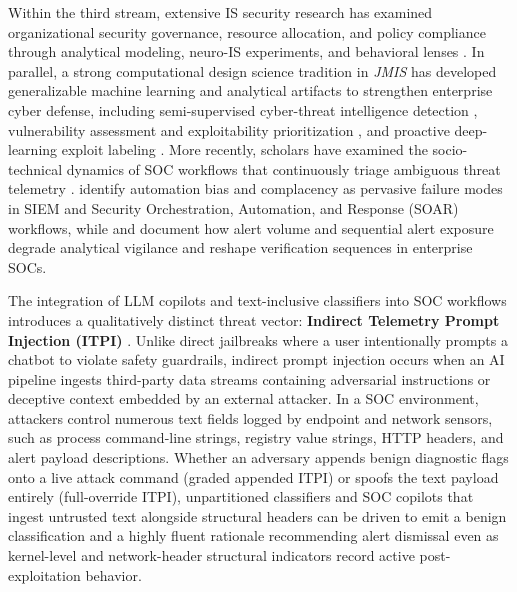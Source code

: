 \documentclass[11pt,a4paper]{article}
\begin{document}
Within the third stream, extensive IS security research has examined organizational security governance, resource allocation, and policy compliance through analytical modeling, neuro-IS experiments, and behavioral lenses \citep{dhillon2001current, willison2013beyond, darcy2014stress, lowry2014control, lowry2015explaining, anderson2016warning, willison2016neutralization, cram2017organizational, darcy2017cognitive, lowry2017security, moody2018unified, trang2019neutralization, cram2020seeing, liu2020centralized, li2021roles, jensen2022improving, schuetz2025heeding}. In parallel, a strong computational design science tradition in \textit{JMIS} has developed generalizable machine learning and analytical artifacts to strengthen enterprise cyber defense, including semi-supervised cyber-threat intelligence detection \citep{ebrahimi2020semi}, vulnerability assessment and exploitability prioritization \citep{li2022assessing}, and proactive deep-learning exploit labeling \citep{ampel2024improving}. More recently, scholars have examined the socio-technical dynamics of SOC workflows that continuously triage ambiguous threat telemetry \citep{naseer2023enabling, tilbury2024automation, tariq2025alert, srinivas2025ai, bartal2026alert}. \citet{tilbury2024automation} identify automation bias and complacency as pervasive failure modes in SIEM and Security Orchestration, Automation, and Response (SOAR) workflows, while \citet{tariq2025alert} and \citet{bartal2026alert} document how alert volume and sequential alert exposure degrade analytical vigilance and reshape verification sequences in enterprise SOCs.

The integration of LLM copilots and text-inclusive classifiers into SOC workflows introduces a qualitatively distinct threat vector: \textbf{Indirect Telemetry Prompt Injection (ITPI)} \citep{srinivas2025ai}. Unlike direct jailbreaks where a user intentionally prompts a chatbot to violate safety guardrails, indirect prompt injection occurs when an AI pipeline ingests third-party data streams containing adversarial instructions or deceptive context embedded by an external attacker. In a SOC environment, attackers control numerous text fields logged by endpoint and network sensors, such as process command-line strings, registry value strings, HTTP headers, and alert payload descriptions. Whether an adversary appends benign diagnostic flags onto a live attack command (graded appended ITPI) or spoofs the text payload entirely (full-override ITPI), unpartitioned classifiers and SOC copilots that ingest untrusted text alongside structural headers can be driven to emit a benign classification and a highly fluent rationale recommending alert dismissal even as kernel-level and network-header structural indicators record active post-exploitation behavior.
\end{document}
